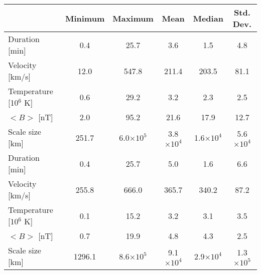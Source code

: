 \begin{tabular}{lccccc}
\hline
                       & Minimum & Maximum & Mean & Median & Std. Dev. \\
\hline
Duration [min]         &     0.4 &      25.7 &      3.6 &     1.5 &       4.8 \\
Velocity [km/s]        &    12.0 &     547.8 &    211.4 &   203.5 &      81.1 \\
Temperature [10$^6$ K] &     0.6 &      29.2 &      3.2 &     2.3 &       2.5 \\
$<B>$ [nT]             &     2.0 &      95.2 &     21.6 &    17.9 &      12.7 \\
Scale size [km]        &   251.7 & 6.0$\times 10^5$ & 3.8$\times 10^4$ & 1.6$\times 10^4$ &   5.6$\times 10^4$ \\

\hline \hline

Duration [min]          &     0.4 &      25.7 &      5.0 &     1.6 &       6.6 \\
Velocity [km/s]         &   255.8 &     666.0 &    365.7 &   340.2 &      87.2 \\
Temperature [10$^6$ K]  &     0.1 &      15.2 &      3.2 &     3.1 &       3.5 \\
$<B>$ [nT]              &     0.7 &      19.9 &      4.8 &     4.3 &       2.5 \\
Scale size [km]         &  1296.1 & 8.6$\times 10^5$ & 9.1$\times 10^4$ & 2.9$\times 10^4$ &  1.3$\times 10^5$ \\
\hline
\end{tabular}